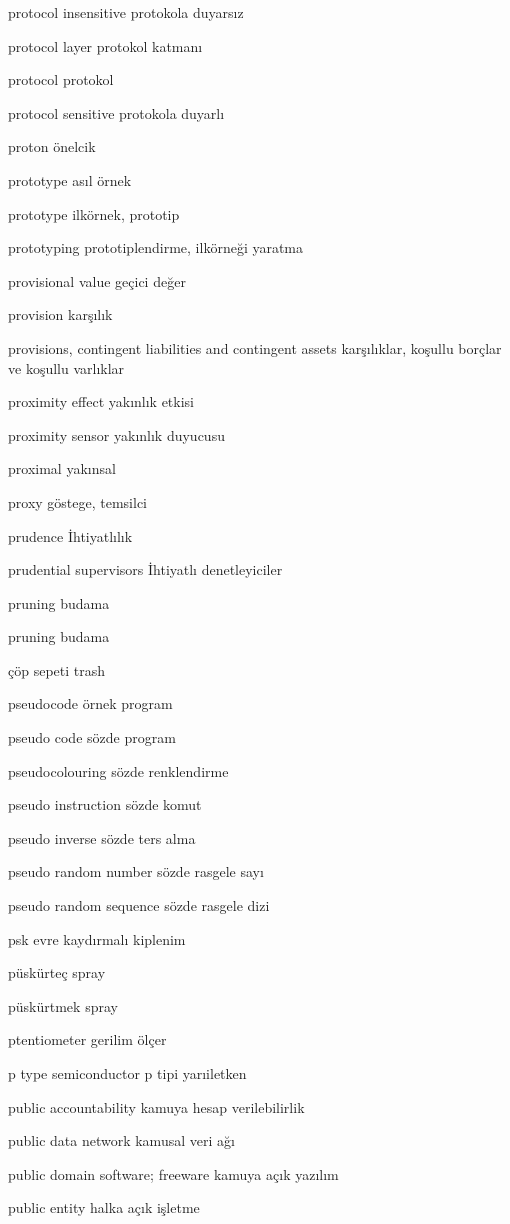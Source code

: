 \documentclass[12pt,fleqn]{article}\usepackage{../../common}
\begin{document}
protocol insensitive protokola duyarsız

protocol layer protokol katmanı

protocol protokol

protocol sensitive protokola duyarlı

proton önelcik

prototype asıl örnek

prototype ilkörnek, prototip

prototyping prototiplendirme, ilkörneği yaratma

provisional value geçici değer

provision karşılık

provisions, contingent liabilities and contingent assets karşılıklar, koşullu borçlar ve koşullu varlıklar

proximity effect yakınlık etkisi

proximity sensor yakınlık duyucusu

proximal yakınsal

proxy göstege, temsilci

prudence İhtiyatlılık

prudential supervisors İhtiyatlı denetleyiciler

pruning budama

pruning budama

çöp sepeti trash

pseudocode örnek program

pseudo code sözde program

pseudocolouring sözde renklendirme

pseudo instruction sözde komut

pseudo inverse sözde ters alma

pseudo random number sözde rasgele sayı

pseudo random sequence sözde rasgele dizi

psk evre kaydırmalı kiplenim

püskürteç spray

püskürtmek spray

ptentiometer gerilim ölçer

p type semiconductor p tipi yarıiletken

public accountability kamuya hesap verilebilirlik

public data network kamusal veri ağı

public domain software; freeware kamuya açık yazılım

public entity halka açık işletme
\end{document}
